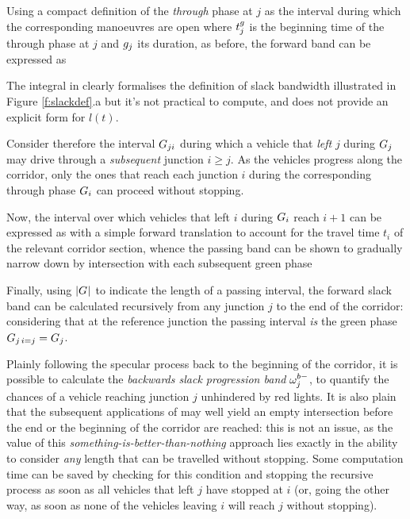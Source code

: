 Using a compact definition of the \emph{through} phase at $j$ as the interval during which the corresponding manoeuvres are open
where $t_{j}^{\scriptstyle{g}}$ is the beginning time of the through phase at $j$ and $g_{j}$ its duration, as before, the forward band can be expressed as

The integral in  clearly formalises the definition of slack bandwidth illustrated in Figure \ref{f:slackdef}.a but it's not practical to compute, and does not provide an explicit form for $l(t)$.


Consider therefore the interval $G_{ji}$ during which a vehicle that \emph{left} $j$ during $G_{j}$ may drive through a \emph{subsequent} junction $i \geqslant j$. As the vehicles progress along the corridor, only the ones that reach each junction $i$ during the corresponding through phase $G_{i}$ can proceed without stopping.

Now, the interval over which vehicles that left $i$ during $G_{i}$ reach $i+1$ can be expressed as 
with a simple forward translation to account for the travel time $t_i$ of the relevant corridor section, whence the passing band can be shown to gradually narrow down by intersection with each subsequent green phase

Finally, using $|G_{}|$ to indicate the length of a passing interval, the forward slack band can be calculated recursively from any junction $j$ to the end of the corridor:
considering that at the reference junction the passing interval \emph{is} the green phase $G_{j\, i=j} = G_{j}$.

Plainly following the specular process back to the beginning of the corridor, it is possible to calculate the \emph{backwards slack progression band} $\omega_{j}^{\scriptstyle{b-}}$, to quantify the chances of a vehicle reaching junction $j$ unhindered by red lights. It is also plain that the subsequent applications of  may well yield an empty intersection before the end or the beginning of the corridor are reached: this is not an issue, as the value of this \emph{something-is-better-than-nothing} approach lies exactly in the ability to consider \emph{any} length that can be travelled without stopping. Some computation time can be saved by checking for this condition and stopping the recursive process  as soon as all vehicles that left $j$ have stopped at $i$ (or, going the other way, as soon as none of the vehicles leaving $i$ will reach $j$ without stopping).

